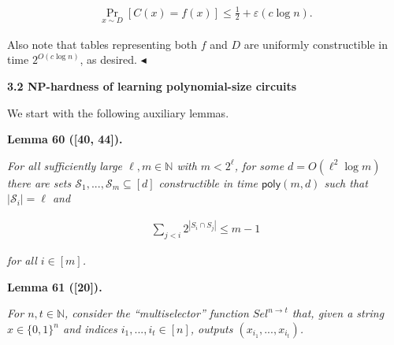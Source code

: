 \documentclass[10pt,a4paper]{article}
\begin{document}
\[\begin{gathered}
\Pr_{x\sim D}[C(x)=f(x)]\leq\frac{1}{2}+\varepsilon(c\log n).
\end{gathered}\]


Also note that tables representing both $f$ and $D$ are uniformly constructible in time $2^{O(c\log n)}$, as desired.
$\blacktriangleleft$\par







\par\medskip\noindent\textbf{
3.2 NP-hardness of learning polynomial-size circuits}\par




We start with the following auxiliary lemmas.\par





\par\medskip\noindent\textbf{
\textbf{Lemma 60}\textbf{ }([40, 44])\textbf{.}
}\par



\emph{For all sufficiently large $\ell,m\in\mathbb{N}$ with $m<2^{\ell}$, for some $d=O(\ell^{2}\log m)$ there are sets $\mathcal{S}_{1},...,\mathcal{S}_{m}\subseteq[d]$ constructible in time ${\mathsf{poly}}(m,d)$ such that $|\mathcal{S}_{i}|=\ell$ and}\par


\[\begin{gathered}
\sum_{j<i}2^{|S_{i}\cap S_{j}|}\leq m-1
\end{gathered}\]


\emph{for all $i\in[m]$.}\par







\par\medskip\noindent\textbf{
\textbf{Lemma 61}\textbf{ }([20])\textbf{.}
}\par



\emph{For $n,t\in\mathbb{N}$, consider the “multiselector” function $Sel^{n\to t}$ that, given a string $x\in\{0,1\}^{n}$ and indices $i_{1},...,i_{t}\in[n]$, outputs $(x_{i_{1}},...,x_{i_{t}})$.}\par
\end{document}
